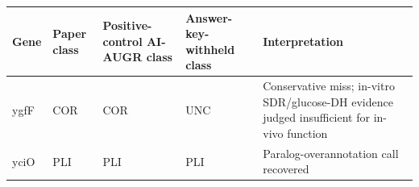 \documentclass[
  11pt,
]{article}
\begin{document}
\begin{longtable}[]{@{}lllll@{}}
\toprule
\begin{minipage}[b]{0.17\columnwidth}\raggedright
Gene\strut
\end{minipage} & \begin{minipage}[b]{0.17\columnwidth}\raggedright
Paper class\strut
\end{minipage} & \begin{minipage}[b]{0.17\columnwidth}\raggedright
Positive-control AI-AUGR class\strut
\end{minipage} & \begin{minipage}[b]{0.17\columnwidth}\raggedright
Answer-key-withheld class\strut
\end{minipage} & \begin{minipage}[b]{0.17\columnwidth}\raggedright
Interpretation\strut
\end{minipage}\tabularnewline
\midrule
\endhead
\begin{minipage}[t]{0.17\columnwidth}\raggedright
ygfF\strut
\end{minipage} & \begin{minipage}[t]{0.17\columnwidth}\raggedright
COR\strut
\end{minipage} & \begin{minipage}[t]{0.17\columnwidth}\raggedright
COR\strut
\end{minipage} & \begin{minipage}[t]{0.17\columnwidth}\raggedright
UNC\strut
\end{minipage} & \begin{minipage}[t]{0.17\columnwidth}\raggedright
Conservative miss; in-vitro SDR/glucose-DH evidence judged insufficient
for in-vivo function\strut
\end{minipage}\tabularnewline
\begin{minipage}[t]{0.17\columnwidth}\raggedright
yciO\strut
\end{minipage} & \begin{minipage}[t]{0.17\columnwidth}\raggedright
PLI\strut
\end{minipage} & \begin{minipage}[t]{0.17\columnwidth}\raggedright
PLI\strut
\end{minipage} & \begin{minipage}[t]{0.17\columnwidth}\raggedright
PLI\strut
\end{minipage} & \begin{minipage}[t]{0.17\columnwidth}\raggedright
Paralog-overannotation call recovered\strut

\end{minipage}
\end{longtable}
\end{document}
